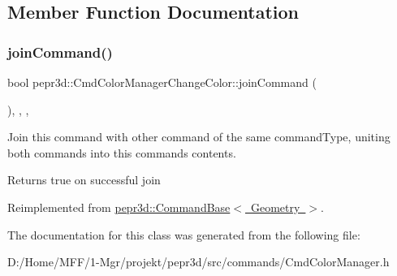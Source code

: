 \subsection{Member Function Documentation}
\mbox{\label{classpepr3d_1_1_cmd_color_manager_change_color_a0c77133a022d16d1aa55ba477dade531}} 
\subsubsection{\texorpdfstring{joinCommand()}{joinCommand()}}
{\footnotesize\ttfamily bool pepr3d\+::\+Cmd\+Color\+Manager\+Change\+Color\+::join\+Command (\begin{DoxyParamCaption}\item[{const \mbox{\hyperlink{classpepr3d_1_1_command_base}{Command\+Base}} \&}]{ }\end{DoxyParamCaption})\hspace{0.3cm}{\ttfamily [inline]}, {\ttfamily [override]}, {\ttfamily [protected]}, {\ttfamily [virtual]}}



Join this command with other command of the same command\+Type, uniting both commands into this command\textquotesingle{}s contents. 

\begin{DoxyReturn}{Returns}
true on successful join 
\end{DoxyReturn}


Reimplemented from \mbox{\hyperlink{classpepr3d_1_1_command_base_a9ef408154b7cb446e626e049f268abb4}{pepr3d\+::\+Command\+Base$<$ Geometry $>$}}.



The documentation for this class was generated from the following file\+:\begin{DoxyCompactItemize}
\item 
D\+:/\+Home/\+M\+F\+F/1-\/\+Mgr/projekt/pepr3d/src/commands/Cmd\+Color\+Manager.\+h\end{DoxyCompactItemize}
